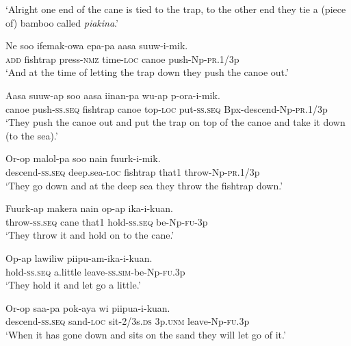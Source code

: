 \glt ‘Alright one end of the cane is tied to the trap, to the other end they tie a (piece of) bamboo called \textit{piakina}.’ \\
\z


\ea\label{ex:a:x15}
\gll  Ne  soo  ifemak-owa  epa-pa  aasa  suuw-i-mik. \\
\textsc{add}  fishtrap  press-\textsc{nmz}  time-\textsc{loc}  canoe  push{}-Np-\textsc{pr}.1/3p \\
\glt ‘And at the time of letting the trap down they push the canoe out.’ \\
\z


\ea\label{ex:a:x16}
\gll  Aasa  suuw-ap  soo  aasa  iinan-pa  wu-ap           p-ora-i-mik. \\
canoe  push-\textsc{ss.seq}  fishtrap  canoe  top-\textsc{loc}  put-\textsc{ss.seq}  Bpx-descend-Np-\textsc{pr}.1/3p \\


\glt ‘They push the canoe out and put the trap on top of the canoe and take it down (to the sea).’ \\
\z


\ea\label{ex:a:x17}
\gll  Or-op  malol-pa  soo  nain  fuurk-i-mik. \\
descend-\textsc{ss.seq}  deep.sea-\textsc{loc}  fishtrap  that1  throw{}-Np-\textsc{pr}.1/3p \\
\glt ‘They go down and at the deep sea they throw the fishtrap down.’ \\
\z


\ea\label{ex:a:x18}
\gll  Fuurk-ap  makera  nain  op-ap  ika-i-kuan. \\
throw-\textsc{ss.seq}  cane  that1  hold-\textsc{ss.seq}  be-Np-\textsc{fu}-3p \\
\glt ‘They throw it and hold on to the cane.’ \\
\z


\ea\label{ex:a:x19}
\gll  Op-ap  lawiliw  piipu-am-ika-i-kuan. \\
hold-\textsc{ss.seq}  a.little  leave-\textsc{ss}.\textsc{sim}-be-Np-\textsc{fu}.3p \\
\glt ‘They hold it and let go a little.’ \\
\z


\ea\label{ex:a:x20}
\gll  Or-op  saa-pa  pok-aya  wi  piipua-i-kuan. \\
descend-\textsc{ss.seq}  sand-\textsc{loc}  sit-2/3s.\textsc{ds}  3p.\textsc{unm}  leave-Np-\textsc{fu}.3p \\
\glt ‘When it has gone down and sits on the sand they will let go of it.’ \\
\z



